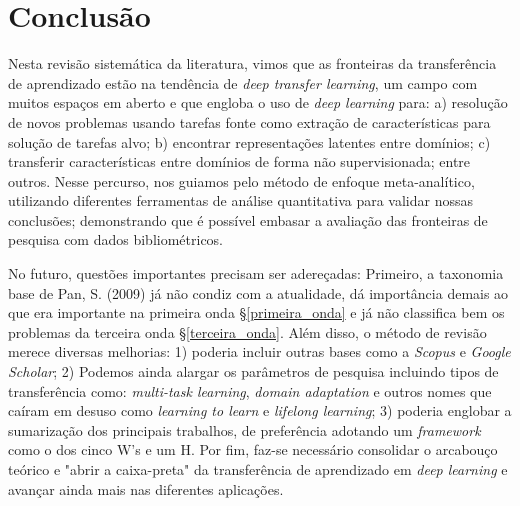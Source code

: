 \documentclass[sigconf]{acmart}
\begin{document}
\section{Conclusão}\label{conclusao}
Nesta revisão sistemática da literatura, vimos que as fronteiras da transferência de aprendizado estão na tendência de \emph{deep transfer learning}, um campo com muitos espaços em aberto e que engloba o uso de \emph{deep learning} para: a) resolução de novos problemas usando tarefas fonte como extração de características para solução de tarefas alvo; b) encontrar representações latentes entre domínios; c) transferir características entre domínios de forma não supervisionada; entre outros. 
Nesse percurso, nos guiamos pelo método de enfoque meta-analítico, utilizando diferentes ferramentas de análise quantitativa para validar nossas conclusões; demonstrando que é possível embasar a avaliação das fronteiras de pesquisa com dados bibliométricos.

No futuro, questões importantes precisam ser adereçadas: Primeiro, a taxonomia base de Pan, S. (2009)\cite{PanYang} já não condiz com a atualidade, dá importância demais ao que era importante na primeira onda \S\ref{primeira_onda} e já não classifica bem os problemas da terceira onda \S\ref{terceira_onda}.  Além disso, o método de revisão merece diversas melhorias: 1) poderia incluir outras bases como a \emph{Scopus} e \emph{Google Scholar}; 2) Podemos ainda alargar os parâmetros de pesquisa incluindo tipos de transferência como: \emph{multi-task learning}, \emph{domain adaptation} e outros nomes que caíram em desuso como \emph{learning to learn} e \emph{lifelong learning}; 3) poderia englobar a sumarização dos principais trabalhos, de preferência adotando um \emph{framework} como o dos cinco W's e um H\cite{hohman2018visual}.
Por fim, faz-se necessário consolidar o arcabouço teórico e "abrir a caixa-preta" da transferência de aprendizado em \emph{deep learning} e avançar ainda mais nas diferentes aplicações.


\end{document}

